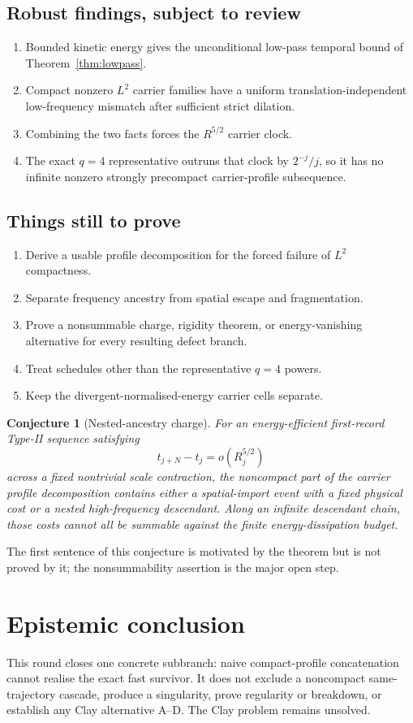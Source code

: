 \documentclass[11pt]{article}
\newtheorem{conjecture}[theorem]{Conjecture}
\theoremstyle{remark}
\begin{document}
\subsection*{Robust findings, subject to review}

\begin{enumerate}
\item Bounded kinetic energy gives the unconditional low-pass temporal bound
of Theorem~\ref{thm:lowpass}.
\item Compact nonzero \(L^2\) carrier families have a uniform
translation-independent low-frequency mismatch after sufficient strict
dilation.
\item Combining the two facts forces the \(R^{5/2}\) carrier clock.
\item The exact \(q=4\) representative outruns that clock by
\(2^{-j}/j\), so it has no infinite nonzero strongly precompact
carrier-profile subsequence.
\end{enumerate}

\subsection*{Things still to prove}

\begin{enumerate}
\item Derive a usable profile decomposition for the forced failure of
\(L^2\) compactness.
\item Separate frequency ancestry from spatial escape and fragmentation.
\item Prove a nonsummable charge, rigidity theorem, or energy-vanishing
alternative for every resulting defect branch.
\item Treat schedules other than the representative \(q=4\) powers.
\item Keep the divergent-normalised-energy carrier cells separate.
\end{enumerate}

\begin{conjecture}[Nested-ancestry charge]
For an energy-efficient first-record Type-II sequence satisfying
\[
 t_{j+N}-t_j=o(R_j^{5/2})
\]
across a fixed nontrivial scale contraction, the noncompact part of the
carrier profile decomposition contains either a spatial-import event with a
fixed physical cost or a nested high-frequency descendant.  Along an
infinite descendant chain, those costs cannot all be summable against the
finite energy-dissipation budget.
\end{conjecture}

The first sentence of this conjecture is motivated by the theorem but is not
proved by it; the nonsummability assertion is the major open step.

\section{Epistemic conclusion}

This round closes one concrete subbranch: naive compact-profile
concatenation cannot realise the exact fast survivor.  It does not exclude a
noncompact same-trajectory cascade, produce a singularity, prove regularity
or breakdown, or establish any Clay alternative A--D.  The Clay problem
remains unsolved.
\end{document}
